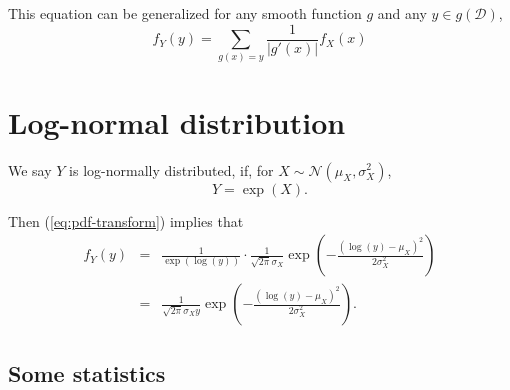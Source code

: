 \documentclass[10pt, twoside]{book}   	%
\begin{document}
This equation can be generalized for any smooth function $g$
and any $y\in g(\mathcal{D})$,
\begin{equation}
f_Y(y) = \sum_{g(x)=y} \frac{1}{|g'(x)|} f_X(x)
\end{equation}

\section{Log-normal distribution}

 We say $Y$ is log-normally distributed, if, for $X\sim\mathcal{N}(\mu_X,\sigma_X^2)$,
 \begin{equation}
 Y = \exp(X).
 \end{equation}

Then (\ref{eq:pdf-transform}) implies that
\begin{eqnarray}
f_Y(y) &=& \frac{1}{\exp(\log(y))} \cdot \frac{1}{\sqrt{2\pi} \sigma_X}  \exp\left(-\frac{(\log(y)-\mu_X)^2}{2\sigma_X^2}\right)
\nonumber
\\
&=& \frac{1}{\sqrt{2\pi} \sigma_X y}  \exp\left(-\frac{(\log(y)-\mu_X)^2}{2\sigma_X^2}\right).
\label{eq:log-normal-pdf}
\end{eqnarray}


\subsection{Some statistics}
\end{document}

